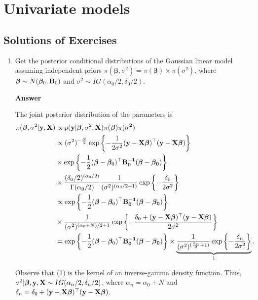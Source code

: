 \chapter{Univariate models}\label{chap6}

\section{Solutions of Exercises}\label{sec61}
\begin{enumerate}[leftmargin=*]

	\item Get the posterior conditional distributions of the Gaussian linear model assuming independent priors $\pi(\bm{\beta},\sigma^2)=\pi(\bm{\beta})\times\pi(\sigma^2)$, where $\bm{\beta} \sim N(\bm{\beta}_0, {\bf{B}}_0)$ and $\sigma^2 \sim IG(\alpha_0/2, \delta_0/2)$.
	
\textbf{Answer}
	
The joint posterior distribution of the parameters is
\begin{align*}
	\pi(\bm{\beta}, \sigma^2|\bf{y}, \bf{X}) & \propto p({\bf{y}}|\bm{\beta}, \sigma^2, \bf{X}) \pi(\bm{\beta}) \pi(\sigma^2) \\
	&\propto (\sigma^2)^{-\frac{N}{2}}\exp\left\{-\frac{1}{2\sigma^2}(\bf{y}-\bf{X}\bm{\beta})^{\top}(\bf{y}-\bf{X}\bm{\beta})\right\}\\
	&\times \exp\left\{-\frac{1}{2}(\bm{\beta} - \bm{\beta} _0)^{\top}\bf{B}_0^{-1}(\bm{\beta} - \bm{\beta}_0)\right\}\\
	&\times\frac{(\delta_0/2)^{(\alpha_0/2)}}{\Gamma(\alpha_0/2)}\frac{1}{(\sigma^2)^{(\alpha_0/2+1)}}\exp\left\{-\frac{\delta_0}{2\sigma^2}\right\}\\
	&\propto\exp\left\{-\frac{1}{2}(\bm{\beta} - \bm{\beta}_0)^{\top}\bf{B}_0^{-1}(\bm{\beta} - \bm{\beta}_0)\right\}\\
	&\times\frac{1}{(\sigma^2)^{(\alpha_0+N)/2+1}} \exp\left\{-\frac{\delta_0+(\bf{y}-\bf{X}\bm{\beta})^{\top}(\bf{y}-\bf{X}\bm{\beta})}{2\sigma^2}\right\}\\
	&=\exp\left\{-\frac{1}{2}(\bm{\beta} - \bm{\beta}_0)^{\top}\bf{B}_0^{-1}(\bm{\beta} - \bm{\beta}_0)\right\}\times\underbrace{\frac{1}{(\sigma^2)^{(\frac{\alpha_n}{2}+1)}} \exp\left\{-\frac{\delta_n}{2\sigma^2}\right\}}_1.
\end{align*}

Observe that (1) is the kernel of an inverse-gamma density function. Thus, $\sigma^2|\bm{\beta},{\bf{y}},{\bf{X}} \sim IG(\alpha_n/2,\delta_n/2)$, where $\alpha_n=\alpha_0+N$ and $\delta_n=\delta_0+(\bf{y}-\bf{X}\bm{\beta})^{\top}(\bf{y}-\bf{X}\bm{\beta})$.


\end{enumerate}
